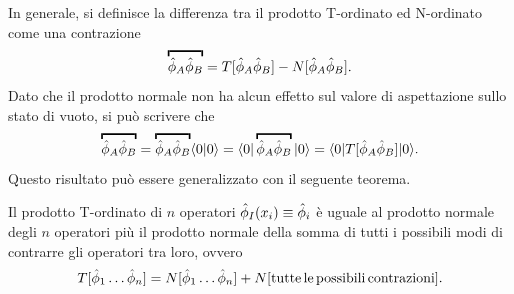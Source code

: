 In generale, si definisce la differenza tra il prodotto T-ordinato ed N-ordinato come una contrazione
\begin{equation}
\label{eq: definizione contrazione}
    \overbracket{\hatphi_A\hatphi_B}=T[\hatphi_A\hatphi_B]-N[\hatphi_A\hatphi_B].
\end{equation}
Dato che il prodotto normale non ha alcun effetto sul valore di aspettazione sullo stato di vuoto, si può scrivere che
\begin{equation}
    \label{eq: relazione tra contraz. e VEV}
    \overbracket{\hatphi_A\hatphi_B}=\overbracket{\hatphi_A\hatphi_B}\mybraket{0}{0}=\mybrakett{0}{\overbracket{\hatphi_A\hatphi_B}}{0}=\mybrakett{0}{T[\hatphi_A\hatphi_B]}{0}.
\end{equation}
Questo risultato può essere generalizzato con il seguente teorema.
\begin{teo}
    Il prodotto T-ordinato di $n$ operatori $\hat{\phi}_I(x_i) \equiv \hat{\phi}_i$ è uguale al prodotto normale degli $n$ operatori più il prodotto normale della somma di tutti i possibili modi di contrarre gli operatori tra loro, ovvero
    \begin{equation}
        T[\hat{\phi}_1\dots\hat{\phi}_n] = N[\hat{\phi}_1\dots\hat{\phi}_n] + N[\mathrm{tutte\,le\,possibili\,contrazioni}].
    \end{equation}
\end{teo}
